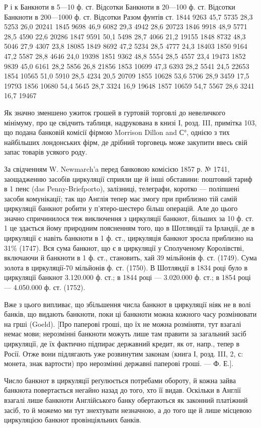 Р і к    Банкноти в 5—10 ф. ст. Відсотки    Банкноти в 20—100 ф. ст. Відсотки    Банкноти в 200—1000
ф. ст. Відсотки    Разом  фунтів  ст.
1844         9263    45,7    5735    28,3    5253    26,0    20241
1845         9698    46,9    6082    29,3    4942    28,6    20723
1846         9918    48,9    5771    28,5    4590    22,6    20286
1847         9591    50,1    5498    28,7    4066    21,2    19155
1848         8732    48,3    5046    27,9    4307    23,8    18085
1849         8692    47,2    5234    28,5    4777    24,3    18403
1850         9164    47,2    5587    28,8    4646    24,0    19398
1851        9362    48,8    5554    28,5    4557    23,4    19473
1852        9839    45,0    6161    28,2    5856    26,8    21856
1853         10699    47,3    6393    28,2    5541    24,5    22653
1854         10565    51,0    5910    28,5    4234    20,5       20709
1855         10628    53,6    5706    28,9    3459    17,5    19793
1856         10680    54,4    5645    28,7    3324    16,9    19648
1857         10659    54,7    5567    28,6    3241    16,7    19467

Як значно зменшено ужиток грошей в гуртовій торговлі до невеличкого
мінімуму, про це свідчить таблиця, надрукована в книзі І, розд. III, примітка 103,
що подана банковій комісії фірмою Morrison Dillon and С°, однією з тих найбільших
лондонських фірм, де дрібний торговець може закупити ввесь свій запас
товарів усякого роду.

За свідченням W. Newmarch’a перед банковою комісією 1857 р. № 1741,
заощадженню засобів циркуляції сприяли ще й інші обставини: поштовий тариф
в 1 пенс (das Penny-Briefporto), залізниці, телеграфи, коротко — поліпшені засоби
комунікації; так що Англія тепер має змогу при приблизно тій самій циркуляції
банкнот робити у п’ятеро-шестеро більш операцій. Але до цього значно
спричинилося теж виключення з циркуляції банкнот, більших за 10 ф. ст. 1 це
здається йому природним поясненням того, що в Шотляндії та Ірландії, де в
циркуляції є навіть банкноти в 1 ф. ст., циркуляція банкнот зросла приблизно
на 31\% (1747). Вся сума банкнот, що є в циркуляції у Сполученому Королівстві,
включаючи й банкноти в 1 ф. ст., становить, хай 39 мільйонів ф. ст.
(1749). Сума золота в циркуляції-70 мільйонів ф. ст. (1750). В Шотляндії
в 1834 році було в циркуляції банкнот 3.120.000 ф. ст.; в 1844 році —
3.020.000 ф. ст.; в 1854 році — 4.050.000 ф. ст. (1752).

Вже з цього випливає, що збільшення числа банкнот в циркуляції ніяк
не в волі банків, що видають банкноти, поки ці банкноти можна кожного часу
розмінювати на грші (Goeld). [Про паперові гроші, що їх не можна розміняти,
тут взагалі немає мови; нерозмінні банкноти можуть лише там правити за загальний
засіб циркуляції, де їх фактично підпирає державний кредит, як от, напр., тепер
в Росії. Отже вони підлягають уже розвинутим законам (книга І, розд. III, 2, с:
монета, знак вартости) про нерозмінні державні паперові гроші. — Ф. Е.].

Число банкнот в циркуляції реґулюється потребами обороту, й кожна
зайва банкнота повертається негайно назад до того, хто її видав. Оскільки в
Англії взагалі лише банкноти Англійського банку обертаються як законний
платіжний засіб, то й можемо ми тут знехтувати незначною, а до того ще й лише
місцевою циркуляцією банкнот провінціяльних банків.
